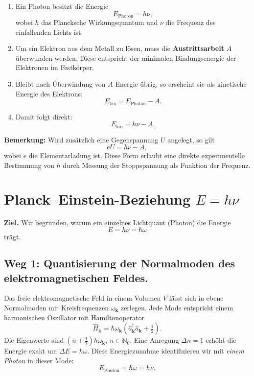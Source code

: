 \begin{enumerate}
	\item Ein Photon besitzt die Energie
	\[
	E_{\text{Photon}} = h \nu,
	\]
	wobei \( h \) das Plancksche Wirkungsquantum und \( \nu \) die Frequenz des einfallenden Lichts ist.
	
	\item Um ein Elektron aus dem Metall zu lösen, muss die \textbf{Austrittsarbeit} \( A \) überwunden werden. Diese entspricht der minimalen Bindungsenergie der Elektronen im Festkörper.
	
	\item Bleibt nach Überwindung von \( A \) Energie übrig, so erscheint sie als kinetische Energie des Elektrons:
	\[
	E_{\text{kin}} = E_{\text{Photon}} - A.
	\]
	
	\item Damit folgt direkt:
	\[
	E_{\text{kin}} = h \nu - A.
	\]
\end{enumerate}

\textbf{Bemerkung:}  
Wird zusätzlich eine Gegenspannung \( U \) angelegt, so gilt
\[
eU = h \nu - A,
\]
wobei \( e \) die Elementarladung ist. Diese Form erlaubt eine direkte experimentelle Bestimmung von \( h \) durch Messung der Stoppspannung als Funktion der Frequenz.

\section{Planck–Einstein-Beziehung \texorpdfstring{$E = h\nu$}{E = hν}}
\label{anhangA:planckEinstein}

\textbf{Ziel.} Wir begründen, warum ein einzelnes Lichtquant (Photon) die Energie
\[
E = h\nu = \hbar \omega
\]
trägt.

\subsection*{Weg 1: Quantisierung der Normalmoden des elektromagnetischen Feldes.}
Das freie elektromagnetische Feld in einem Volumen \(V\) lässt sich in ebene Normalmoden mit Kreisfrequenzen \(\omega_{\mathbf{k}}\) zerlegen. Jede Mode entspricht einem harmonischen Oszillator mit Hamiltonoperator
\[
\hat H_{\mathbf{k}}=\hbar \omega_{\mathbf{k}}\!\left(\hat a_{\mathbf{k}}^\dagger \hat a_{\mathbf{k}}+\tfrac12\right).
\]
Die Eigenwerte sind \((n+\tfrac12)\hbar\omega_{\mathbf{k}}\), \(n\in \mathbb{N}_0\). 
Eine Anregung \(\Delta n = 1\) erhöht die Energie exakt um \(\Delta E = \hbar \omega\). 
Diese Energiezunahme identifizieren wir mit \emph{einem Photon} in dieser Mode:
\[
E_{\text{Photon}}=\hbar\omega=h\nu.
\]

